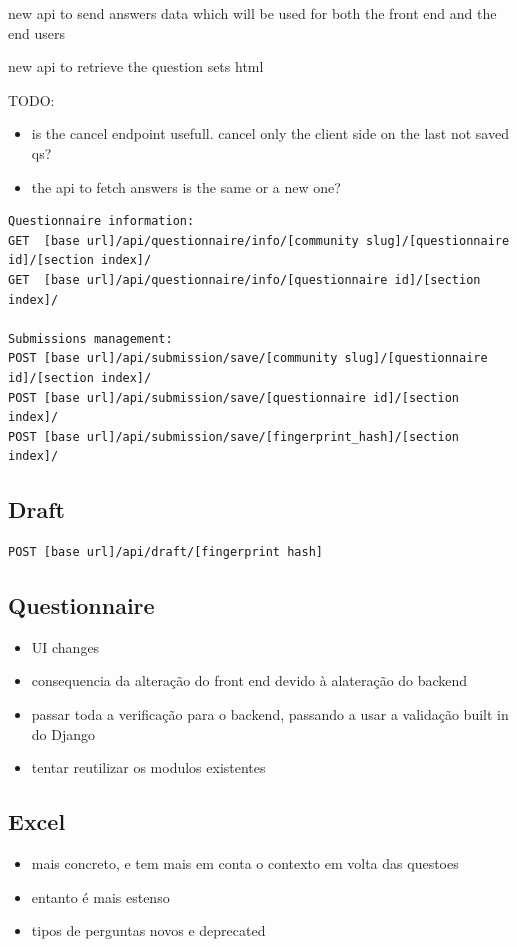 new api to send answers data which will be used for both the front end and the end users

new api to retrieve the question sets html

TODO:
\begin{itemize}
    \item is the cancel endpoint usefull. cancel only the client side on the last not saved qs?
    \item the api to fetch answers is the same or a new one?
\end{itemize}

\begin{lstlisting}[basicstyle=\scriptsize]
Questionnaire information:
GET  [base url]/api/questionnaire/info/[community slug]/[questionnaire id]/[section index]/
GET  [base url]/api/questionnaire/info/[questionnaire id]/[section index]/

Submissions management:
POST [base url]/api/submission/save/[community slug]/[questionnaire id]/[section index]/
POST [base url]/api/submission/save/[questionnaire id]/[section index]/
POST [base url]/api/submission/save/[fingerprint_hash]/[section index]/
\end{lstlisting}

\subsection*{Draft}

\begin{verbatim}
POST [base url]/api/draft/[fingerprint hash]
\end{verbatim}

\subsection{Questionnaire}
\begin{itemize}
    \item UI changes
    \item consequencia da alteração do front end devido à alateração do backend
    \item passar toda a verificação para o backend, passando a usar a validação built in do Django
    \item tentar reutilizar os modulos existentes
\end{itemize}

\subsection{Excel}
\begin{itemize}
    \item mais concreto, e tem mais em conta o contexto em volta das questoes
    \item entanto é mais estenso
    \item tipos de perguntas novos e deprecated
\end{itemize}
